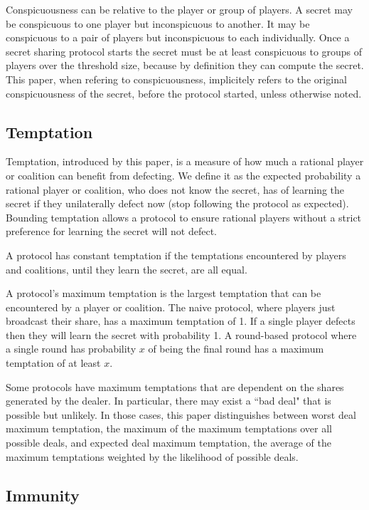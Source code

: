\documentclass{dalcsthesis}
\begin{document}
Conspicuousness can be relative to the player or group of players. A secret may be conspicuous to one player but inconspicuous to another. It may be conspicuous to a pair of players but inconspicuous to each individually. Once a secret sharing protocol starts the secret must be at least conspicuous to groups of players over the threshold size, because by definition they can compute the secret. This paper, when refering to conspicuousness, implicitely refers to the original conspicuousness of the secret, before the protocol started, unless otherwise noted.

\subsection{Temptation}

Temptation, introduced by this paper, is a measure of how much a rational player or coalition can benefit from defecting. We define it as the expected probability a rational player or coalition, who does not know the secret, has of learning the secret if they unilaterally defect now (stop following the protocol as expected). Bounding temptation allows a protocol to ensure rational players without a strict preference for learning the secret will not defect.

A protocol has constant temptation if the temptations encountered by players and coalitions, until they learn the secret, are all equal.

A protocol's maximum temptation is the largest temptation that can be encountered by a player or coalition. The naive protocol, where players just broadcast their share, has a maximum temptation of 1. If a single player defects then they will learn the secret with probability 1. A round-based protocol where a single round has probability $x$ of being the final round has a maximum temptation of at least $x$.

Some protocols have maximum temptations that are dependent on the shares generated by the dealer. In particular, there may exist a ``bad deal" that is possible but unlikely. In those cases, this paper distinguishes between worst deal maximum temptation, the maximum of the maximum temptations over all possible deals, and expected deal maximum temptation, the average of the maximum temptations weighted by the likelihood of possible deals.

\subsection {Immunity}
\end{document}
